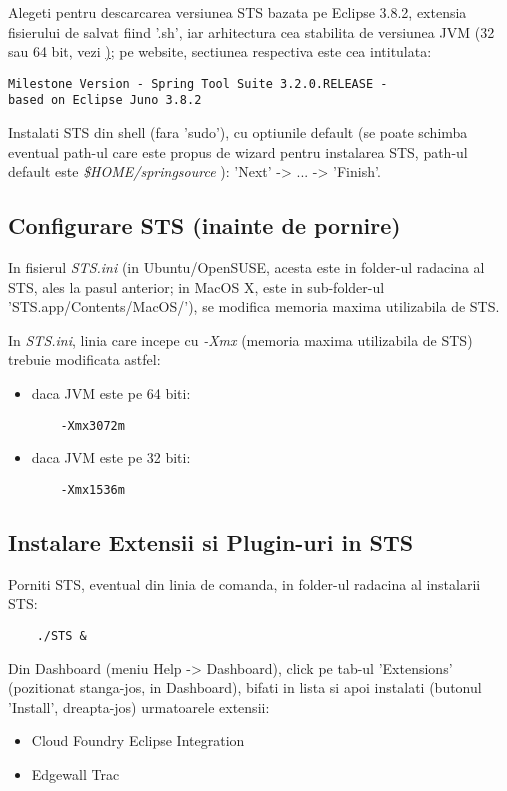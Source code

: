 Alegeti pentru descarcarea versiunea STS bazata pe Eclipse 3.8.2, extensia
fisierului de salvat fiind '.sh', iar arhitectura cea stabilita de versiunea
JVM (32 sau 64 bit, vezi \href{java_version}); pe website, sectiunea respectiva
este cea intitulata:
\begin{verbatim}
Milestone Version - Spring Tool Suite 3.2.0.RELEASE - 
based on Eclipse Juno 3.8.2
\end{verbatim}

Instalati STS din shell (fara 'sudo'), cu optiunile default (se poate
schimba eventual path-ul care este propus de wizard pentru instalarea STS,
path-ul default este \emph{\$HOME/springsource} ):
'Next' -> ... -> 'Finish'.

\subsection{Configurare STS (inainte de pornire)}
In fisierul \emph{STS.ini} (in Ubuntu/OpenSUSE, acesta este in folder-ul
radacina al STS, ales la pasul anterior; in MacOS X, este in sub-folder-ul
'STS.app/Contents/MacOS/'), se modifica memoria maxima utilizabila de STS.

In \emph{STS.ini}, linia care incepe cu \emph{-Xmx} (memoria maxima utilizabila
de STS) trebuie modificata astfel:
\begin{itemize} 
\item daca JVM este pe 64 biti:
\begin{lstlisting}
	-Xmx3072m
\end{lstlisting}
\item daca JVM este pe 32 biti:
\begin{lstlisting}
	-Xmx1536m
\end{lstlisting}
\end{itemize}

\subsection{Instalare Extensii si Plugin-uri in STS}

Porniti STS, eventual din linia de comanda, in folder-ul radacina al instalarii STS:
\begin{lstlisting}	
	./STS &
\end{lstlisting}

Din Dashboard (meniu Help -> Dashboard), click pe tab-ul 'Extensions'
(pozitionat stanga-jos, in Dashboard), bifati in lista si apoi instalati
(butonul 'Install', dreapta-jos) urmatoarele extensii:
\begin{itemize}
  \item Cloud Foundry Eclipse Integration
  \item Edgewall Trac
\end{itemize} 

